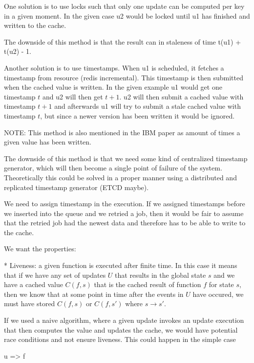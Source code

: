 One solution is to use locks such that only one update can be computed per
key in a given moment. In the given case u2 would be locked until u1 has
finished and written to the cache.

The downside of this method is that the result can in staleness of time t(u1) + t(u2) - 1.


Another solution is to use timestamps. When u1 is scheduled, it fetches a
timestamp from resource (redis incremental). This timestamp is then submitted
when the cached value is written. In the given example u1 would get one
timestamp $t$ and u2 will then get $t + 1$. u2 will then submit a cached value
with timestamp $t + 1$ and afterwards u1 will try to submit a stale cached value
with timestamp $t$, but since a newer version has been written it would be ignored.

NOTE: This method is also mentioned in the IBM paper as amount of times a given
value has been written.

The downside of this method is that we need some kind of centralized timestamp
generator, which will then become a single point of failure of the system.
Theoretically this could be solved in a proper manner using a distributed
and replicated timestamp generator (ETCD maybe).

We need to assign timestamp in the execution. If we assigned timestamps before
we inserted into the queue and we retried a job, then it would be fair to
assume that the retried job had the newest data and therefore has to be able
to write to the cache.



We want the properties:

* Liveness: a given function is executed after finite time. In this case it
  means that if we have any set of updates $U$ that results in the global state
  $s$ and we have a cached value $C(f, s)$ that is the cached result
  of function $f$ for state $s$, then we know that at some point in time after
  the events in $U$ have occured, we must have stored $C(f, s)$ or $C(f, s')$
  where $s \rightarrow s'$.

If we used a naive algorithm, where a given update invokes an update execution
that then computes the value and updates the cache, we would have potential
race conditions and not ensure liveness. This could happen in the simple case

u => f

